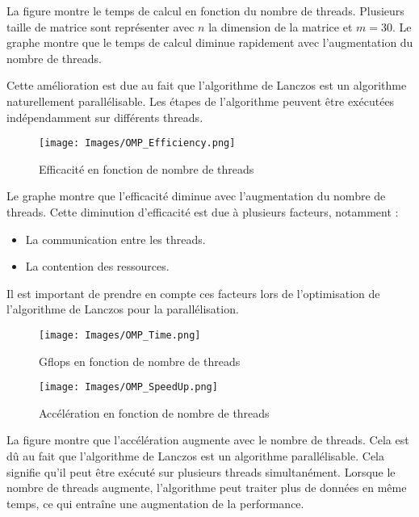 \documentclass[11pt,french]{article}
\begin{document}
    La figure montre le temps de calcul en fonction du nombre de threads. Plusieurs taille de matrice sont représenter avec $n$ la dimension de la matrice et $m = 30$. Le graphe montre que le temps de calcul diminue rapidement avec l'augmentation du nombre de threads.
    
    Cette amélioration est due au fait que l'algorithme de Lanczos est un algorithme naturellement parallélisable. Les étapes de l'algorithme peuvent être exécutées indépendamment sur différents threads.
    \begin{figure}[h]
    \centering
    \texttt{[image: Images/OMP\_Efficiency.png]}
    \caption{Efficacité en fonction de nombre de threads}
    \label{fig:mesh1}
    \end{figure}
    \FloatBarrier
    
    Le graphe montre que l'efficacité diminue avec l'augmentation du nombre de threads. Cette diminution d'efficacité est due à plusieurs facteurs, notamment :
    \begin{itemize}
        \item La communication entre les threads.
        \item La contention des ressources.
    \end{itemize}
    
    Il est important de prendre en compte ces facteurs lors de l'optimisation de l'algorithme de Lanczos pour la parallélisation.
    \begin{figure}[h]
    \centering
    \texttt{[image: Images/OMP\_Time.png]}
    \caption{Gflops en fonction de nombre de threads}
    \label{fig:mesh1}
    \end{figure}
    \FloatBarrier
    
    \begin{figure}[h]
    \centering
    \texttt{[image: Images/OMP\_SpeedUp.png]}
    \caption{Accélération en fonction de nombre de threads}
    \label{fig:mesh1}
    \end{figure}
    \FloatBarrier
    
    La figure montre que l'accélération augmente avec le nombre de threads. Cela est dû au fait que l'algorithme de Lanczos est un algorithme parallélisable. Cela signifie qu'il peut être exécuté sur plusieurs threads simultanément. Lorsque le nombre de threads augmente, l'algorithme peut traiter plus de données en même temps, ce qui entraîne une augmentation de la performance.
    \FloatBarrier
    
\end{document}
